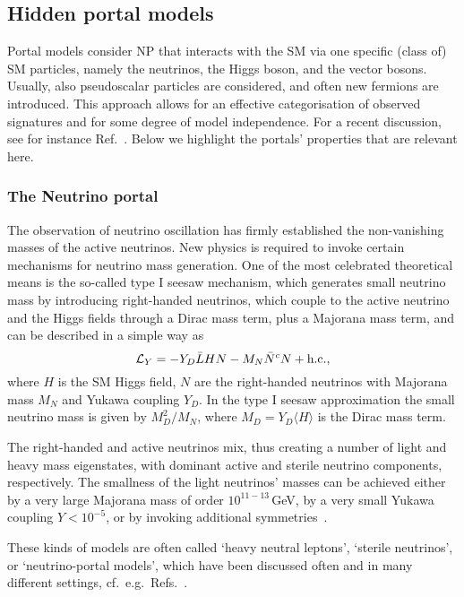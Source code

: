 \documentclass[10pt]{article}
\begin{document}
\subsection{Hidden portal models}
%
Portal models consider NP that interacts with the SM via one specific (class of) SM particles, namely the neutrinos, the Higgs boson, and the vector bosons. Usually, also pseudoscalar particles are considered, and often new fermions are introduced.
This approach allows for an effective categorisation of observed signatures and for some degree of model independence.
For a recent discussion, see for instance Ref.~\cite{Agrawal:2021dbo}.
Below we highlight the portals' properties that are relevant here.


\subsubsection{The Neutrino portal}
%
The observation of neutrino oscillation has firmly established the non-vanishing masses of the active neutrinos. New physics is required to invoke certain mechanisms for neutrino mass generation. 
One of the most celebrated theoretical means is the so-called type I seesaw mechanism, which generates small neutrino mass by introducing right-handed neutrinos, which couple to the active neutrino and the Higgs fields through a Dirac mass term, plus a Majorana mass term, and can be described in a simple way as
%
\begin{equation}
{\cal L}_Y = - Y_D \bar{L} H N - M_N \bar N^c N + \text{h.c.},
\end{equation}
%
where $H$ is the SM Higgs field, $N$ are the right-handed neutrinos with Majorana mass $M_N$ and Yukawa coupling $Y_D$. 
In the type I seesaw approximation the small neutrino mass is given by $ M_D^2 / M_N$, where $M_D= Y_D \langle H \rangle$ is the Dirac mass term.

The right-handed and active neutrinos mix, thus creating a number of light and heavy mass eigenstates, with dominant active and sterile neutrino components, respectively.
The smallness of the light neutrinos' masses can be achieved either by a very large Majorana mass of order $10^{11-13}$\,GeV, by a very small Yukawa coupling $Y<10^{-5}$, or by invoking additional symmetries~\cite{Mohapatra:1986bd}. 

These kinds of models are often called `heavy neutral leptons', `sterile neutrinos', or `neutrino-portal models', which have been discussed often and in many different settings, cf.\ e.g.\ Refs.~\cite{Dasgupta:2021ies,Cottin:2018kmq,Antusch:2018svb,Helo:2018qej,deVries:2020qns,Chiang:2019ajm}.
\end{document}
